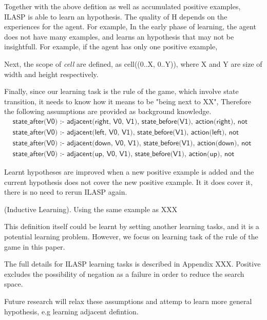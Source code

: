 Together with the above defition as well as accumulated positive examples, ILASP is able to learn an hypothesis. The quality of H depends on the experiences for the agent.
For example, In the early phase of learning, the agent does not have many examples, and learns an hypothesis that may not be insightfull.
For example, if the agent has only one positive example,

Next, the scope of \textit{cell} are defined, as cell((0..X, 0..Y)), where X and Y are size of width and height respectively.

Finally, since our learning task is the rule of the game, which involve state transition, it needs to know how it means to be "being next to XX",
Therefore the following assumptions are provided as background knowledge.
\begin{equation}
\begin{split}
&\textsf{state\_after(V0) :- adjacent(right, V0, V1), state\_before(V1), action(right), not wall(V0).}\\
&\textsf{state\_after(V0) :- adjacent(left, V0, V1), state\_before(V1), action(left), not wall(V0).}\\
&\textsf{state\_after(V0) :- adjacent(down, V0, V1), state\_before(V1), action(down), not wall(V0).}\\
&\textsf{state\_after(V0) :- adjacent(up, V0, V1), state\_before(V1), action(up), not wall(V0).}
\end{split}
\end{equation}

Learnt hypotheses are improved when a new positive example is added and the current hypothesis does not cover the new positive example.
It it does cover it, there is no need to rerun ILASP again. 

\begin{examp} \normalfont (Inductive Learning).
Using the same example as
XXX
\end{examp}

This definition itself could be learnt by setting another learning tasks, and it is a potential learning problem.
However, we focus on learning task of the rule of the game in this paper.

The full details for ILASP learning tasks is described in Appendix XXX.
Positive excludes the possibility of negation as a failure in order to reduce the search space.

Future research will relax these assumptions and attemp to learn more general hypothesis,
e.g learning adjacent defintion.

